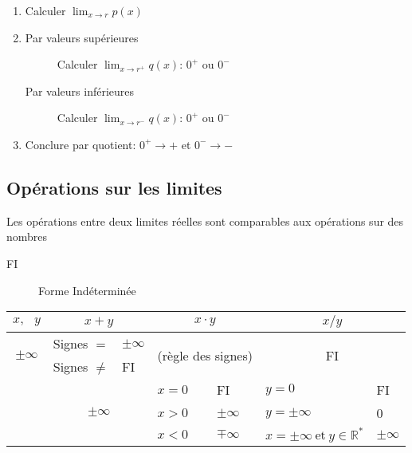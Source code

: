 \documentclass{article}
\newcommand{\R}{\mathds{R}}
\newcommand{\oo}{\infty}
\newcommand{\twoRows}[1]{\multirow{2}{*}{#1}}
\newcommand{\threeRows}[1]{\multirow{3}{*}{#1}}
\newcommand{\twoCols}[1]{\multicolumn{2}{c|}{#1}}
\newcommand{\twoColsNB}[1]{\multicolumn{2}{c}{#1}}
\newcommand{\et}{\:\text{et}\:}
\begin{document}
\begin{enumerate}
    \item Calculer $\displaystyle \lim_{x\to r} p(x)$
    \item
        \begin{description}
        
            \item[Par valeurs supérieures] Calculer $\displaystyle\lim_{x\to r^+} q(x)$: $0^+$ ou $0^-$
            \item[Par valeurs inférieures] Calculer $\displaystyle\lim_{x\to r^-} q(x)$: $0^+$ ou $0^-$
        \end{description}
    \item Conclure par quotient: $0^+ \to +$ et $0^- \to -$
\end{enumerate}



\subsection{Opérations sur les limites}\label{ops_limites}

Les opérations entre deux limites réelles sont comparables aux opérations sur des nombres
\begin{description}
\item[FI] Forme Indéterminée
\end{description}

\begin{table}[H]
\centering
\begin{tabular}{c||ll|ll|ll}

$x,\:\:\: y$                             & \multicolumn{2}{c}{$x+y$}     & \multicolumn{2}{c}{$x\cdot y$}           & \multicolumn{2}{c}{$x/y$}              \\
\hline\hline
\twoRows{$\pm\oo$}                       & Signes $=$     & $\pm\oo$     & \twoCols{\twoRows{(règle des signes)}}   & \twoColsNB{\twoRows{FI}}               \\
                                         & Signes $\not=$ & FI           &                                          &                                   \\
\hline
\twoRows{\threeRows{$\R$ ou $\pm\oo$}}   & \twoCols{\threeRows{$\pm\oo$}}& $x = 0$          & FI                    & $y = 0$       & FI                     \\
                                         &                               && $x > 0$          & $\pm\oo$              & $y= \pm\oo$   & 0                      \\
                                         &                               && $x < 0$          & $\mp\oo$              & $x = \pm\oo \et y \in \R^\ast$  & $\pm\oo$               \\

\end{tabular}
\end{table}
\end{document}
